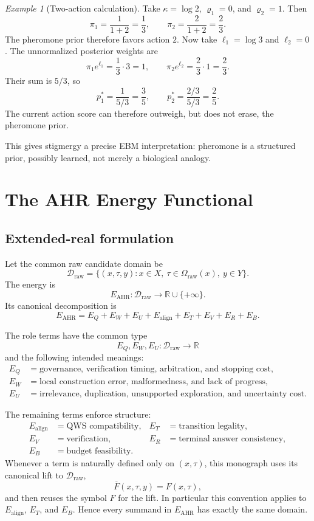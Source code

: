 \documentclass[11pt,oneside]{book}
\theoremstyle{remark}
\newtheorem{example}[definition]{Example}
\newcommand{\Om}{\Omega}
\begin{document}
\begin{example}[Two-action calculation]
Take $\kappa=\log2$, $\varrho_1=0$, and $\varrho_2=1$. Then
\[
\pi_1=\frac{1}{1+2}=\frac13,
\qquad
\pi_2=\frac{2}{1+2}=\frac23.
\]
The pheromone prior therefore favors action $2$. Now take
$\ell_1=\log3$ and $\ell_2=0$. The unnormalized posterior weights are
\[
\pi_1e^{\ell_1}=\frac13\cdot3=1,
\qquad
\pi_2e^{\ell_2}=\frac23\cdot1=\frac23.
\]
Their sum is $5/3$, so
\[
p_1^*=\frac{1}{5/3}=\frac35,
\qquad
p_2^*=\frac{2/3}{5/3}=\frac25.
\]
The current action score can therefore outweigh, but does not erase, the
pheromone prior.
\end{example}

This gives stigmergy a precise EBM interpretation: pheromone is a structured
prior, possibly learned, not merely a biological analogy.

\chapter{The AHR Energy Functional}

\section{Extended-real formulation}

Let the common raw candidate domain be
\[
\mathcal D_{\mathrm{raw}}
=\{(x,\tau,y):x\in X,\ \tau\in\Om_{\mathrm{raw}}(x),\ y\in Y\}.
\]
The energy is
\[
E_{\mathrm{AHR}}:\mathcal D_{\mathrm{raw}}
\to\mathbb R\cup\{+\infty\}.
\]
Its canonical decomposition is
\[
\boxed{
E_{\mathrm{AHR}}
=E_Q+E_W+E_U+E_{\mathrm{align}}+E_T+E_V+E_R+E_B.}
\]

The role terms have the common type
\[
E_Q,E_W,E_U:\mathcal D_{\mathrm{raw}}\to\mathbb R
\]
and the following intended meanings:
\begin{align*}
E_Q&=\text{governance, verification timing, arbitration, and stopping cost},\\
E_W&=\text{local construction error, malformedness, and lack of progress},\\
E_U&=\text{irrelevance, duplication, unsupported exploration, and uncertainty cost}.
\end{align*}

The remaining terms enforce structure:
\begin{align*}
E_{\mathrm{align}}&=\text{QWS compatibility},&
E_T&=\text{transition legality},\\
E_V&=\text{verification},&
E_R&=\text{terminal answer consistency},\\
E_B&=\text{budget feasibility}.
\end{align*}
Whenever a term is naturally defined only on $(x,\tau)$, this monograph uses
its canonical lift to $\mathcal D_{\mathrm{raw}}$,
\[
\overline F(x,\tau,y)=F(x,\tau),
\]
and then reuses the symbol $F$ for the lift. In particular this convention
applies to $E_{\mathrm{align}}$, $E_T$, and $E_B$. Hence every summand in
$E_{\mathrm{AHR}}$ has exactly the same domain.
\end{document}
